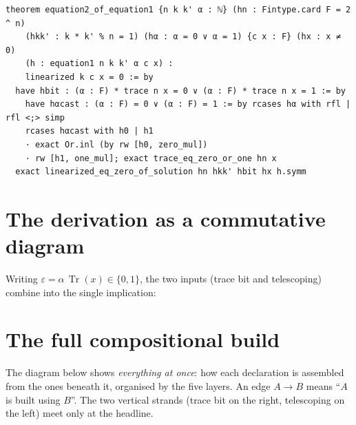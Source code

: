 \documentclass[11pt]{article}
\newcommand{\lc}[1]{\texttt{#1}}
\newcommand{\Tr}{\operatorname{Tr}}
\begin{document}
\begin{lstlisting}
theorem equation2_of_equation1 {n k k' α : ℕ} (hn : Fintype.card F = 2 ^ n)
    (hkk' : k * k' % n = 1) (hα : α = 0 ∨ α = 1) {c x : F} (hx : x ≠ 0)
    (h : equation1 n k k' α c x) :
    linearized k c x = 0 := by
  have hbit : (α : F) * trace n x = 0 ∨ (α : F) * trace n x = 1 := by
    have hαcast : (α : F) = 0 ∨ (α : F) = 1 := by rcases hα with rfl | rfl <;> simp
    rcases hαcast with h0 | h1
    · exact Or.inl (by rw [h0, zero_mul])
    · rw [h1, one_mul]; exact trace_eq_zero_or_one hn x
  exact linearized_eq_zero_of_solution hn hkk' hbit hx h.symm
\end{lstlisting}

\section{The derivation as a commutative diagram}
Writing $\varepsilon=\alpha\,\Tr(x)\in\{0,1\}$, the two inputs (trace bit and
telescoping) combine into the single implication:
\begin{center}
\end{center}

\section{The full compositional build}
The diagram below shows \emph{everything at once}: how each declaration is
assembled from the ones beneath it, organised by the five layers.  An edge
$A\to B$ means ``$A$ is built using $B$''.  The two vertical strands (trace bit
on the right, telescoping on the left) meet only at the headline.
\end{document}
